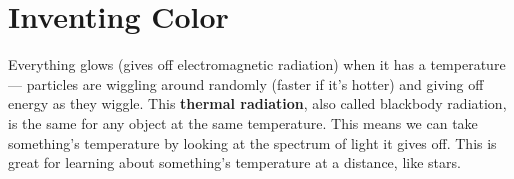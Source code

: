 \chapter{Inventing Color}

%
%
%
%
%
%
%
%
%
%
%
%
%
%

Everything glows (gives off electromagnetic radiation) when it has a temperature --- particles are wiggling around randomly (faster if it's hotter) and giving off energy as they wiggle. This \textbf{thermal radiation}, also called blackbody radiation, is the same for any object at the same temperature. This means we can take something's temperature by looking at the spectrum of light it gives off. This is great for learning about something's temperature at a distance, like stars.

